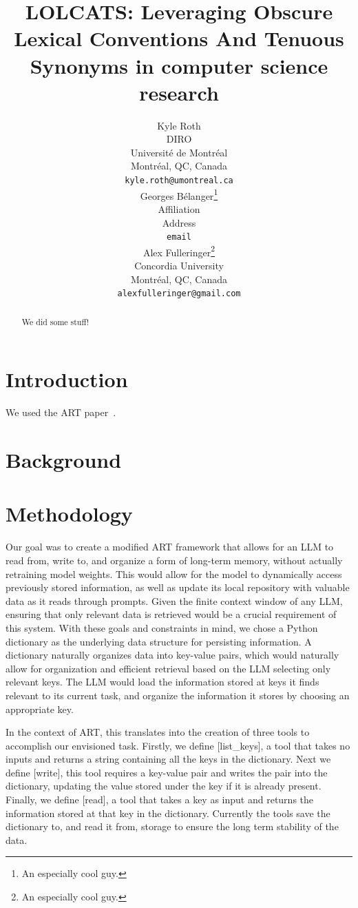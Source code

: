 \documentclass{article}
\title{LOLCATS: Leveraging Obscure Lexical Conventions And Tenuous Synonyms in computer science research}
\author{%
  Kyle Roth \\
  DIRO \\
  Université de Montréal \\
  Montréal, QC, Canada \\
  \texttt{kyle.roth@umontreal.ca} \\
  \And
  Georges Bélanger\thanks{An especially cool guy.} \\
  Affiliation \\
  Address \\
  \texttt{email} \\
  \And
  Alex Fulleringer\thanks{An especially cool guy.} \\
  Concordia University \\
  Montréal, QC, Canada \\
  \texttt{alexfulleringer@gmail.com} \\
}
\begin{document}
\maketitle


\begin{abstract}
  We did some stuff!
\end{abstract}


\section{Introduction}


We used the ART paper~\cite{paranjape2023art}.


\section{Background}


\section{Methodology}

Our goal was to create a modified ART framework that allows for an LLM to read from, write to, and organize a form of long-term memory, without actually retraining model weights.
This would allow for the model to dynamically access previously stored information, as well as update its local repository with valuable data as it reads through prompts.
Given the finite context window of any LLM, ensuring that only relevant data is retrieved would be a crucial requirement of this system.
With these goals and constraints in mind, we chose a Python dictionary as the underlying data structure for persisting information.
A dictionary naturally organizes data into key-value pairs, which would naturally allow for organization and efficient retrieval based on the LLM selecting only relevant keys.
The LLM would load the information stored at keys it finds relevant to its current task, and organize the information it stores by choosing an appropriate key.

In the context of ART, this translates into the creation of three tools to accomplish our envisioned task. Firstly, we define [list_keys], a tool that takes no inputs and returns a string containing all the keys in the dictionary.
Next we define [write], this tool requires a key-value pair and writes the pair into the dictionary, updating the value stored under the key if it is already present.
Finally, we define [read], a tool that takes a key as input and returns the information stored at that key in the dictionary.
Currently the tools save the dictionary to, and read it from, storage to ensure the long term stability of the data.
\end{document}
